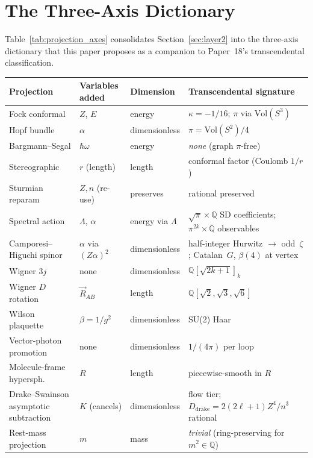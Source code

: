 \documentclass[11pt]{article}
\begin{document}
\section{The Three-Axis Dictionary}
\label{sec:dictionary}

Table~\ref{tab:projection_axes} consolidates Section~\ref{sec:layer2}
into the three-axis dictionary that this paper proposes as a
companion to Paper~18's transcendental classification.

\begin{table}[h]
\centering\small
\begin{tabular}{p{3.5cm} p{3cm} p{2cm} p{4cm}}
\toprule
Projection & Variables added & Dimension & Transcendental signature \\
\midrule
Fock conformal & $Z$, $E$ & energy & $\kappa = -1/16$;
$\pi$ via $\mathrm{Vol}(S^3)$ \\
Hopf bundle & $\alpha$ & dimensionless & $\pi = \mathrm{Vol}(S^2)/4$ \\
Bargmann--Segal & $\hbar\omega$ & energy & \textit{none} (graph
$\pi$-free) \\
Stereographic & $r$ (length) & length & conformal factor (Coulomb
$1/r$) \\
Sturmian reparam & $Z, n$ (re-use) & preserves & rational
preserved \\
Spectral action & $\Lambda$, $\alpha$ & energy via $\Lambda$ &
$\sqrt{\pi}\times \mathbb{Q}$ SD coefficients;
$\pi^{2k}\times \mathbb{Q}$ observables \\
Camporesi--Higuchi spinor & $\alpha$ via $(Z\alpha)^2$ &
dimensionless & half-integer Hurwitz $\to$ odd~$\zeta$;
Catalan~$G$, $\beta(4)$ at vertex \\
Wigner $3j$ & none & dimensionless &
$\mathbb{Q}[\sqrt{2k{+}1}]_k$ \\
Wigner $D$ rotation & $\vec{R}_{AB}$ & length &
$\mathbb{Q}[\sqrt{2}, \sqrt{3}, \sqrt{6}]$ \\
Wilson plaquette & $\beta = 1/g^2$ & dimensionless & SU(2) Haar \\
Vector-photon promotion & none & dimensionless & $1/(4\pi)$ per loop \\
Molecule-frame hypersph. & $R$ & length & piecewise-smooth in $R$ \\
Drake--Swainson asymptotic subtraction & $K$ (cancels) & dimensionless &
flow tier; $D_{\text{drake}} = 2(2\ell+1)Z^4/n^3$ rational \\
Rest-mass projection & $m$ & mass &
\textit{trivial} (ring-preserving for $m^2 \in \mathbb{Q}$) \\

\end{tabular}
\end{table}
\end{document}
